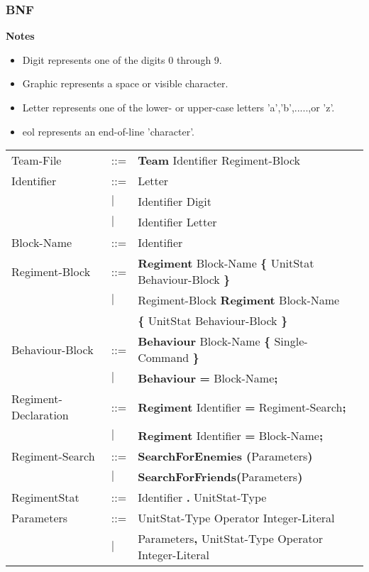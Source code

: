 	\subsubsection{BNF}
		{\bf Notes}
		\begin{itemize}
			\item Digit represents one of the digits 0 through 9.
			\item Graphic represents a space or visible character.
			\item Letter represents one of the lower- or upper-case letters 'a','b',.....,or 'z'.
			\item eol represents an end-of-line 'character'.
		\end{itemize}
		\begin{center}
				\begin{longtable}{l l l}
				\endfirsthead
				\endhead
		Team-File					&	::=	&{\bf Team} Identifier Regiment-Block\\
		Identifier					&	::=	&Letter\\
									&$\mid$	&Identifier Digit\\
									&$\mid$	&Identifier Letter\\
		Block-Name					&	::=	&Identifier\\
		Regiment-Block				&	::=	&{\bf Regiment} Block-Name {\bf \{ } UnitStat Behaviour-Block \bf{\} }\\
									&$\mid$	&Regiment-Block {\bf Regiment} Block-Name\\
									&		&{\bf \{ } UnitStat Behaviour-Block \bf{\} }\\
		Behaviour-Block				&	::=	&{\bf Behaviour} Block-Name {\bf \{} Single-Command {\bf \}}  \\
									&$\mid$	& {\bf Behaviour} {\bf = } Block-Name{\bf ;} \\
		Regiment-Declaration			&	::=	&{\bf Regiment} Identifier {\bf =} Regiment-Search{\bf ;}\\
									&$\mid$	&{\bf Regiment} Identifier {\bf =} Block-Name{\bf ;}\\
		Regiment-Search				&	::=	&{\bf SearchForEnemies (}Parameters{\bf)}\\
									&$\mid$	&{\bf SearchForFriends(}Parameters{\bf)}\\
		RegimentStat				&	::=	&Identifier {\bf.} UnitStat-Type \\
		Parameters					&	::=	&UnitStat-Type Operator Integer-Literal\\
		 							&$\mid$	&Parameters{\bf ,} UnitStat-Type Operator Integer-Literal\\

\end{longtable}
\end{center}
